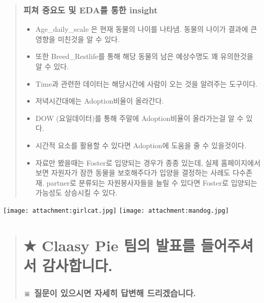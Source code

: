 \documentclass[11pt]{article}
\makeatletter
\def\maxwidth{\ifdim\Gin@nat@width>\linewidth\linewidth
    \else\Gin@nat@width\fi}
\let\Oldincludegraphics\includegraphics
\renewcommand{\includegraphics}[1]{\Oldincludegraphics[width=.8\maxwidth]{#1}}
\providecommand{\tightlist}{%
      \setlength{\itemsep}{0pt}\setlength{\parskip}{0pt}}
\makeatother
\begin{document}
    \begin{quote}
\subsubsection{피쳐 중요도 및 EDA를 통한
insight}\label{uxd53cuxccd0-uxc911uxc694uxb3c4-uxbc0f-edauxb97c-uxd1b5uxd55c-insight}

\begin{itemize}
\tightlist
\item
  Age\_daily\_scale 은 현재 동물의 나이를 나타냄. 동물의 나이가 결과에
  큰 영향을 미친것을 알 수 있다.
\item
  또한 Breed\_Restlife를 통해 해당 동물의 남은 예상수명도 꽤 유의한것을
  알 수 있다.
\item
  Time과 관련한 데이터는 해당시간에 사람이 오는 것을 알려주는 도구이다.
\item
  저녁시간대에는 Adoption비율이 올라간다.
\item
  DOW (요일데이터)를 통해 주말에 Adoption비율이 올라가는걸 알 수 있다.
\item
  시간적 요소를 활용할 수 있다면 Adoption에 도움을 줄 수 있을것이다.
\item
  자료만 봤을때는 Foster로 입양되는 경우가 종종 있는데, 실제
  홈페이지에서보면 자원자가 잠깐 동물을 보호해주다가 입양을 결정하는
  사례도 다수존재. partner로 분류되는 자원봉사자들을 늘릴 수 있다면
  Foster로 입양되는 가능성도 상승시킬 수 있다.
\end{itemize}
\end{quote}

    \texttt{[image: attachment:girlcat.jpg]}
\texttt{[image: attachment:mandog.jpg]}

    \begin{quote}
\section{★ Claasy Pie 팀의 발표를 들어주셔서
감사합니다.}\label{claasy-pie-uxd300uxc758-uxbc1cuxd45cuxb97c-uxb4e4uxc5b4uxc8fcuxc154uxc11c-uxac10uxc0acuxd569uxb2c8uxb2e4.}

\subsubsection{※ 질문이 있으시면 자세히 답변해
드리겠습니다.}\label{uxc9c8uxbb38uxc774-uxc788uxc73cuxc2dcuxba74-uxc790uxc138uxd788-uxb2f5uxbcc0uxd574-uxb4dcuxb9acuxaca0uxc2b5uxb2c8uxb2e4.}
\end{quote}


    
    
    
    
\end{document}
